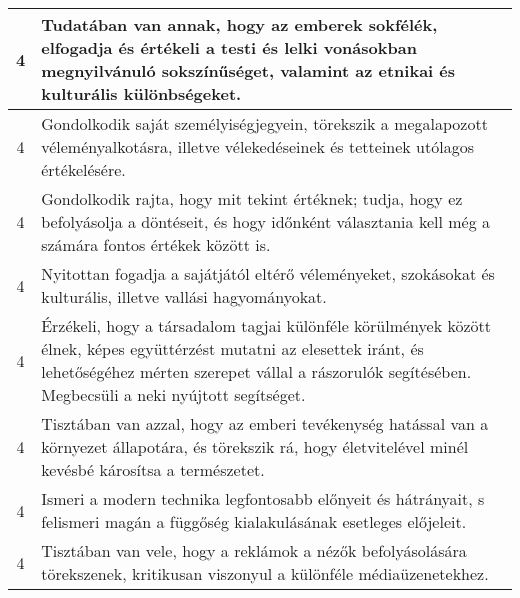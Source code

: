 \begin{longtable}{c | p{} }
                                
                                          4 &  Tudatában van annak, hogy az emberek sokfélék, elfogadja és értékeli a testi és lelki vonásokban megnyilvánuló sokszínűséget, valamint az etnikai és kulturális különbségeket. \\ \hline
                                          4 &  Gondolkodik saját személyiségjegyein, törekszik a megalapozott véleményalkotásra, illetve vélekedéseinek és tetteinek utólagos értékelésére. \\ \hline
                                          4 &  Gondolkodik rajta, hogy mit tekint értéknek; tudja, hogy ez befolyásolja a döntéseit, és hogy időnként választania kell még a számára fontos értékek között is. \\ \hline
                                          4 &  Nyitottan fogadja a sajátjától eltérő véleményeket, szokásokat és kulturális, illetve vallási hagyományokat. \\ \hline
                                          4 &  Érzékeli, hogy a társadalom tagjai különféle körülmények között élnek, képes együttérzést mutatni az elesettek iránt, és lehetőségéhez mérten szerepet vállal a rászorulók segítésében. Megbecsüli a neki nyújtott segítséget. \\ \hline
                                          4 &  Tisztában van azzal, hogy az emberi tevékenység hatással van a környezet állapotára, és törekszik rá, hogy életvitelével minél kevésbé károsítsa a természetet. \\ \hline
                                          4 &  Ismeri a modern technika legfontosabb előnyeit és hátrányait, s felismeri magán a függőség kialakulásának esetleges előjeleit. \\ \hline
                                          4 &  Tisztában van vele, hogy a reklámok a nézők befolyásolására törekszenek, kritikusan viszonyul a különféle médiaüzenetekhez. \\ \hline
                                      
                        \end{longtable}
            \clearpage

